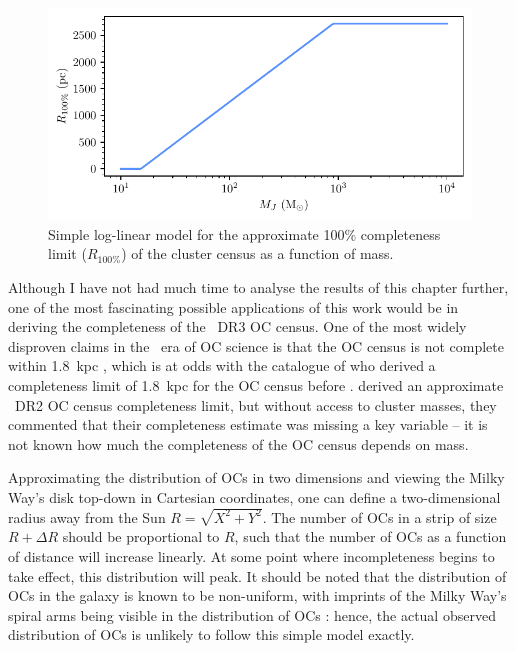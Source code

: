 \begin{figure}[t]
    \centering
    \includegraphics[width=\textwidth]{fig/c4/discussion_completeness_function.pdf}
    \caption[Simple log-linear model for the approximate 100\% completeness limit ($R_{100\%}$) of the cluster census]{Simple log-linear model for the approximate 100\% completeness limit ($R_{100\%}$) of the cluster census as a function of mass.}
    \label{fig:dynamics:discussion:completeness_function}
\end{figure}

Although I have not had much time to analyse the results of this chapter further, one of the most fascinating possible applications of this work would be in deriving the completeness of the \gaia\ DR3 OC census. One of the most widely disproven claims in the \gaia\ era of OC science is that the OC census is not complete within 1.8~kpc \citep{cantat-gaudin_milky_2022}, which is at odds with the catalogue of \cite{kharchenko_global_2013} who derived a completeness limit of 1.8~kpc for the OC census before \gaia. \cite{anders_milky_2020} derived an approximate \gaia\ DR2 OC census completeness limit, but without access to cluster masses, they commented that their completeness estimate was missing a key variable -- it is not known how much the completeness of the OC census depends on mass.

Approximating the distribution of OCs in two dimensions and viewing the Milky Way's disk top-down in Cartesian coordinates, one can define a two-dimensional radius away from the Sun $R=\sqrt{X^2+Y^2}$. The number of OCs in a strip of size $R+\Delta R$ should be proportional to $R$, such that the number of OCs as a function of distance will increase linearly. At some point where incompleteness begins to take effect, this distribution will peak. It should be noted that the distribution of OCs in the galaxy is known to be non-uniform, with imprints of the Milky Way's spiral arms being visible in the distribution of OCs \citep{castro-ginard_milky_2021}: hence, the actual observed distribution of OCs is unlikely to follow this simple model exactly.

